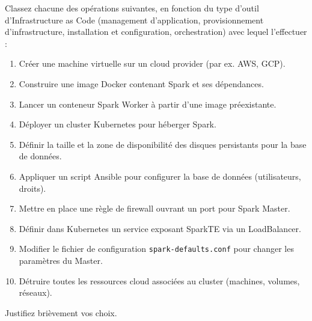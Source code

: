 \documentclass{article}%
\begin{document}
Classez chacune des opérations suivantes, en fonction du type d’outil d'Infrastructure as Code (management d’application, provisionnement d’infrastructure, installation et configuration, orchestration) avec lequel l'effectuer :
\begin{enumerate}
  \item Créer une machine virtuelle sur un cloud provider (par ex. AWS, GCP).  
  \item Construire une image Docker contenant Spark et ses dépendances.  
  \item Lancer un conteneur Spark Worker à partir d’une image préexistante.  
  \item Déployer un cluster Kubernetes pour héberger Spark.  
  \item Définir la taille et la zone de disponibilité des disques persistants pour la base de données.  
  \item Appliquer un script Ansible pour configurer la base de données (utilisateurs, droits).  
  \item Mettre en place une règle de firewall ouvrant un port pour Spark Master.  
  \item Définir dans Kubernetes un service exposant SparkTE via un LoadBalancer.  
  \item Modifier le fichier de configuration \texttt{spark-defaults.conf} pour changer les paramètres du Master.  
  \item Détruire toutes les ressources cloud associées au cluster (machines, volumes, réseaux).  
\end{enumerate}

Justifiez brièvement vos choix.
\end{document}
